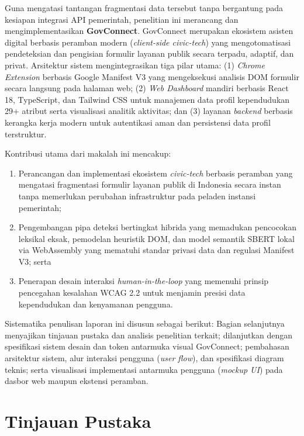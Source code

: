 \documentclass[conference]{IEEEtran}
\begin{document}
Guna mengatasi tantangan fragmentasi data tersebut tanpa bergantung pada kesiapan integrasi API pemerintah, penelitian ini merancang dan mengimplementasikan \textbf{GovConnect}. GovConnect merupakan ekosistem asisten digital berbasis peramban modern (\textit{client-side civic-tech}) yang mengotomatisasi pendeteksian dan pengisian formulir layanan publik secara terpadu, adaptif, dan privat. Arsitektur sistem mengintegrasikan tiga pilar utama: (1) \textit{Chrome Extension} berbasis Google Manifest V3 yang mengeksekusi analisis DOM formulir secara langsung pada halaman web; (2) \textit{Web Dashboard} mandiri berbasis React 18, TypeScript, dan Tailwind CSS untuk manajemen data profil kependudukan 29+ atribut serta visualisasi analitik aktivitas; dan (3) layanan \textit{backend} berbasis kerangka kerja modern untuk autentikasi aman dan persistensi data profil terstruktur.

Kontribusi utama dari makalah ini mencakup:
\begin{enumerate}[label=(\arabic*), leftmargin=*]
    \item Perancangan dan implementasi ekosistem \textit{civic-tech} berbasis peramban yang mengatasi fragmentasi formulir layanan publik di Indonesia secara instan tanpa memerlukan perubahan infrastruktur pada peladen instansi pemerintah;
    \item Pengembangan pipa deteksi bertingkat hibrida yang memadukan pencocokan leksikal eksak, pemodelan heuristik DOM, dan model semantik SBERT lokal via WebAssembly yang mematuhi standar privasi data dan regulasi Manifest V3; serta
    \item Penerapan desain interaksi \textit{human-in-the-loop} yang memenuhi prinsip pencegahan kesalahan WCAG 2.2 untuk menjamin presisi data kependudukan dan kenyamanan pengguna.
\end{enumerate}

Sistematika penulisan laporan ini disusun sebagai berikut: Bagian selanjutnya menyajikan tinjauan pustaka dan analisis penelitian terkait; dilanjutkan dengan spesifikasi sistem desain dan token antarmuka visual GovConnect; pembahasan arsitektur sistem, alur interaksi pengguna (\textit{user flow}), dan spesifikasi diagram teknis; serta visualisasi implementasi antarmuka pengguna (\textit{mockup UI}) pada dasbor web maupun ekstensi peramban.

\section{Tinjauan Pustaka}
\end{document}

